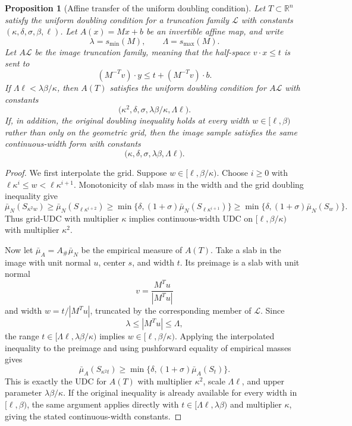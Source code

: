 \documentclass[11pt]{article}
\newtheorem{proposition}[theorem]{Proposition}
\newcommand{\R}{\mathbb{R}}
\newcommand{\emp}{\bar\mu_N}
\begin{document}
\begin{proposition}[Affine transfer of the uniform doubling condition]\label{prop:affine-transfer}
Let $T\subset\R^n$ satisfy the uniform doubling condition for a truncation family
$\mathcal L$ with constants $(\kappa,\delta,\sigma,\beta,\ell)$.  Let
$A(x)=Mx+b$ be an invertible affine map, and write
\[
\lambda=s_{\min}(M),\qquad \Lambda=s_{\max}(M).
\]
Let $A\mathcal L$ be the image truncation family, meaning that the half-space
$v\cdot x\le t$ is sent to
\[
(M^{-T}v)\cdot y\le t+(M^{-T}v)\cdot b .
\]
If
$\Lambda\ell<\lambda\beta/\kappa$, then $A(T)$ satisfies the uniform doubling
condition for $A\mathcal L$ with constants
\[
\bigl(\kappa^2,\delta,\sigma,\lambda\beta/\kappa,\Lambda\ell\bigr).
\]
If, in addition, the original doubling inequality holds at every width
$w\in[\ell,\beta)$ rather than only on the geometric grid, then the image
sample satisfies the same continuous-width form with constants
\[
\bigl(\kappa,\delta,\sigma,\lambda\beta,\Lambda\ell\bigr).
\]
\end{proposition}

\begin{proof}
We first interpolate the grid.  Suppose $w\in[\ell,\beta/\kappa)$.  Choose
$i\ge0$ with $\ell\kappa^i\le w<\ell\kappa^{i+1}$.  Monotonicity of slab mass
in the width and the grid doubling inequality give
\[
\emp(S_{\kappa^2 w})
\ge \emp(S_{\ell\kappa^{i+2}})
\ge \min\{\delta,(1+\sigma)\emp(S_{\ell\kappa^{i+1}})\}
\ge \min\{\delta,(1+\sigma)\emp(S_w)\}.
\]
Thus grid-UDC with multiplier $\kappa$ implies continuous-width UDC on
$[\ell,\beta/\kappa)$ with multiplier $\kappa^2$.

Now let $\bar\mu_A=A_\#\emp$ be the empirical measure of $A(T)$.  Take a slab
in the image with unit normal $u$, center $s$, and width $t$.  Its preimage is a
slab with unit normal
\[
v=\frac{M^Tu}{|M^Tu|}
\]
and width $w=t/|M^Tu|$, truncated by the corresponding member of $\mathcal L$.
Since
\[
\lambda\le |M^Tu|\le \Lambda,
\]
the range $t\in[\Lambda\ell,\lambda\beta/\kappa)$ implies
$w\in[\ell,\beta/\kappa)$.  Applying the interpolated inequality to the
preimage and using pushforward equality of empirical masses gives
\[
\bar\mu_A(S_{\kappa^2 t})
\ge \min\{\delta,(1+\sigma)\bar\mu_A(S_t)\}.
\]
This is exactly the UDC for $A(T)$ with multiplier $\kappa^2$, scale
$\Lambda\ell$, and upper parameter $\lambda\beta/\kappa$.  If the original
inequality is already available for every width in $[\ell,\beta)$, the same
argument applies directly with $t\in[\Lambda\ell,\lambda\beta)$ and multiplier
$\kappa$, giving the stated continuous-width constants.
\end{proof}
\end{document}
